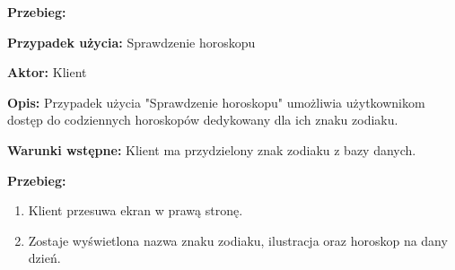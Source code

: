 \textbf{Przebieg:}


\textbf{Przypadek użycia:} Sprawdzenie horoskopu

\textbf{Aktor:} Klient

\textbf{Opis:} Przypadek użycia "Sprawdzenie horoskopu" umożliwia użytkownikom dostęp do
codziennych horoskopów dedykowany dla ich znaku zodiaku.

\textbf{Warunki wstępne:} Klient ma przydzielony znak zodiaku z bazy danych.

\textbf{Przebieg:}
\begin{enumerate}
	\item Klient przesuwa ekran w prawą stronę.
	\item Zostaje wyświetlona nazwa znaku zodiaku, ilustracja oraz horoskop na dany dzień.
\end{enumerate}
